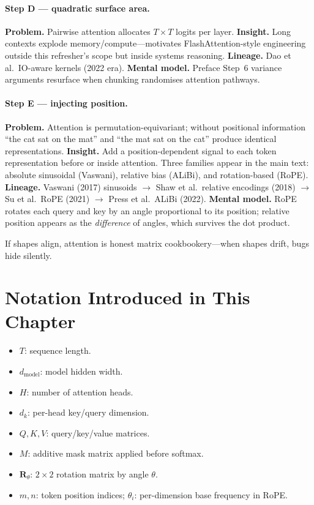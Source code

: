 \paragraph{Step D --- quadratic surface area.}
\textbf{Problem.} Pairwise attention allocates \(T\times T\) logits per layer.
\textbf{Insight.} Long contexts explode memory/compute---motivates FlashAttention-style engineering outside this refresher's scope but inside systems reasoning.
\textbf{Lineage.} Dao et al.\ IO-aware kernels (2022 era).
\textbf{Mental model.} Preface Step~6 variance arguments resurface when chunking randomises attention pathways.

\paragraph{Step E --- injecting position.}
\textbf{Problem.} Attention is permutation-equivariant; without positional information ``the cat sat on the mat'' and ``the mat sat on the cat'' produce identical representations.
\textbf{Insight.} Add a position-dependent signal to each token representation before or inside attention. Three families appear in the main text: absolute sinusoidal (Vaswani), relative bias (ALiBi), and rotation-based (RoPE).
\textbf{Lineage.} Vaswani (2017) sinusoids $\to$ Shaw et al.\ relative encodings (2018) $\to$ Su et al.\ RoPE (2021) $\to$ Press et al.\ ALiBi (2022).
\textbf{Mental model.} RoPE rotates each query and key by an angle proportional to its position; relative position appears as the \emph{difference} of angles, which survives the dot product.

If shapes align, attention is honest matrix cookbookery---when shapes drift, bugs hide silently.

\section*{Notation Introduced in This Chapter}
\begin{itemize}[leftmargin=1.5em]
  \item $T$: sequence length.
  \item $d_{\text{model}}$: model hidden width.
  \item $H$: number of attention heads.
  \item $d_k$: per-head key/query dimension.
  \item $Q,K,V$: query/key/value matrices.
  \item $M$: additive mask matrix applied before softmax.
  \item $\mathbf{R}_\theta$: $2\times 2$ rotation matrix by angle $\theta$.
  \item $m, n$: token position indices; $\theta_i$: per-dimension base frequency in RoPE.
\end{itemize}

